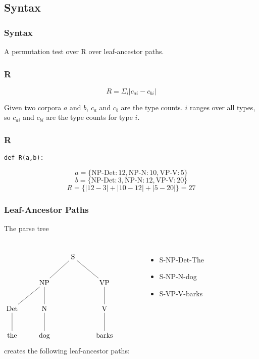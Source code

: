 \documentclass{beamer}
\begin{document}
\subsection{Syntax}
\begin{frame}
\frametitle{Syntax}
  A permutation test over R over leaf-ancestor paths.
\end{frame}
\begin{frame}
\frametitle{R}
\begin{definition}
\begin{equation}
R = \Sigma_i |c_{ai} - c_{bi}|
\label{rmeasure}
\end{equation}
\end{definition}
\noindent{}Given two corpora $a$ and $b$, $c_a$ and $c_b$ are the type
counts. $i$ ranges over all types, so $c_{ai}$ and $c_{bi}$ are the
type counts for type $i$.
\end{frame}
\begin{frame}
\frametitle{R}
  \hspace{-1.0cm} {\tt def R(a,b):} \\
  \hspace{-0.6cm}{\tt sum(abs(ca-cb) for ca,cb in zip(a.values(), b.values()))}
  \begin{example}
    \[a=\{\textrm{NP-Det}:12, \textrm{NP-N}:10, \textrm{VP-V}:5\}\]
    \[b=\{\textrm{NP-Det}:3, \textrm{NP-N}:12, \textrm{VP-V}:20\}\]
    \[R = \{|12-3| + |10-12| + |5-20|\} = 27 \]
  \end{example}
\end{frame}
\begin{frame}
  \frametitle{Leaf-Ancestor Paths}
The parse tree
\begin{columns}
\[\xymatrix{
  &&\textrm{S} \ar@{-}[dl] \ar@{-}[dr] &&\\
  &\textrm{NP} \ar@{-}[d] \ar@{-}[dl] &&\textrm{VP} \ar@{-}[d]\\
  \textrm{Det} \ar@{-}[d] & \textrm{N} \ar@{-}[d] && \textrm{V} \ar@{-}[d] \\
\textrm{the}& \textrm{dog} && \textrm{barks}\\}
\]
creates the following leaf-ancestor paths:
\begin{itemize}
\item S-NP-Det-The
\item S-NP-N-dog
\item S-VP-V-barks
\end{itemize}
\end{columns}
\end{frame}
\end{document}
